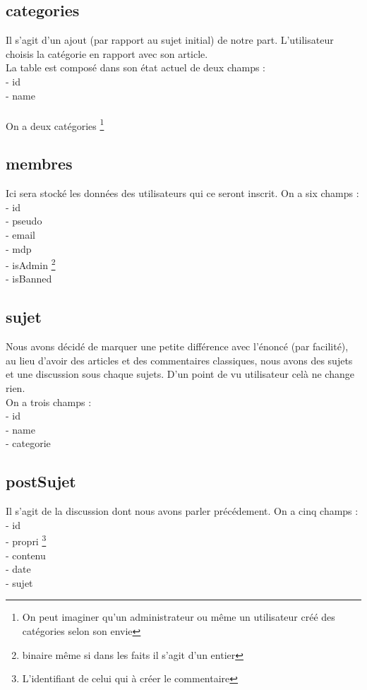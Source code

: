 \documentclass{article}
\begin{document}
    \subsection{categories}
    Il s'agit d'un ajout (par rapport au sujet initial) de notre part. 
    L'utilisateur choisis la catégorie en rapport avec son article. \\
    La table est composé dans son état actuel de deux champs : \\
    - id \\
    - name \\
    \\
    On a deux catégories \footnote{On peut imaginer qu'un administrateur ou même un utilisateur créé des catégories selon son envie}
    \newpage
    \subsection{membres}
    Ici sera stocké les données des utilisateurs qui ce seront inscrit. On a six champs : \\
    - id \\ 
    - pseudo \\ 
    - email \\
    - mdp \\ 
    - isAdmin \footnote{binaire même si dans les faits il s'agit d'un entier}  \\
    - isBanned \footnotemark[2] \\ 
    \subsection{sujet}
    Nous avons décidé de marquer une petite différence avec l'énoncé (par facilité),
    au lieu d'avoir des articles et des commentaires classiques, nous avons des sujets et une discussion sous chaque sujets.
    D'un point de vu utilisateur celà ne change rien. \\ 
    On a trois champs : \\
    - id \\
    - name \\ 
    - categorie 
    \subsection{postSujet}
    Il s'agit de la discussion dont nous avons parler précédement. On a cinq champs : \\
    - id \\ 
    - propri \footnote{L'identifiant de celui qui à créer le commentaire} \\
    - contenu \\ 
    - date \\
    - sujet \\ 
    \newpage 
\end{document}
